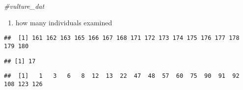 \documentclass[
]{article}
\newenvironment{Shaded}{\begin{snugshade}}{\end{snugshade}}
\newcommand{\CommentTok}[1]{\textcolor[rgb]{0.56,0.35,0.01}{\textit{#1}}}
\newcommand{\FunctionTok}[1]{\textcolor[rgb]{0.13,0.29,0.53}{\textbf{#1}}}
\newcommand{\NormalTok}[1]{#1}
\newcommand{\SpecialCharTok}[1]{\textcolor[rgb]{0.81,0.36,0.00}{\textbf{#1}}}
\providecommand{\tightlist}{%
  \setlength{\itemsep}{0pt}\setlength{\parskip}{0pt}}
\begin{document}
\begin{Shaded}
\begin{Highlighting}[]
\CommentTok{\#vulture\_dat}
\end{Highlighting}
\end{Shaded}

\begin{enumerate}
\def\labelenumi{\alph{enumi}.}
\setcounter{enumi}{1}
\tightlist
\item
  how many individuals examined
\end{enumerate}

\begin{Shaded}
\end{Shaded}

\begin{verbatim}
##  [1] 161 162 163 165 166 167 168 171 172 173 174 175 176 177 178 179 180
\end{verbatim}

\begin{Shaded}
\end{Shaded}

\begin{verbatim}
## [1] 17
\end{verbatim}

\begin{Shaded}
\end{Shaded}

\begin{verbatim}
##  [1]   1   3   6   8  12  13  22  47  48  57  60  75  90  91  92 108 123 126
\end{verbatim}
\end{document}

